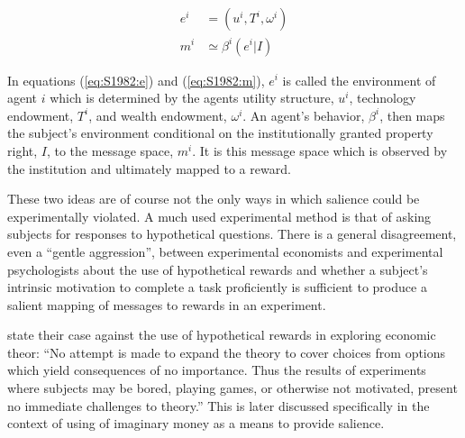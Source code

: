 \documentclass[11pt,a4paper]{report}
\begin{document}
\begin{align}
	e^i &= (u^i, T^i, \omega^i)\label{eq:S1982:e}\\
	m^i &\simeq \beta^i(e^i|I)\label{eq:S1982:m}
\end{align}

In equations (\ref{eq:S1982:e}) and (\ref{eq:S1982:m}), $e^i$ is called the environment of agent $i$ which is determined by the agents utility structure, $u^i$, technology endowment, $T^i$, and wealth endowment, $\omega^i$.
An agent's behavior, $\beta^i$, then maps the subject's environment conditional on the institutionally granted property right, $I$, to the message space, $m^i$.
It is this message space which is observed by the institution and ultimately mapped to a reward.

These two ideas are of course not the only ways in which salience could be experimentally violated.
A much used experimental method is that of asking subjects for responses to hypothetical questions.
There is a general disagreement, even a \enquote{gentle aggression}{\footnotemark}, between experimental economists and experimental psychologists about the use of hypothetical rewards and whether a subject's intrinsic motivation to complete a task proficiently is sufficient to produce a salient mapping of messages to  rewards in an experiment.
\addtocounter{footnote}{-1}

\textcite[624]{Grether1979} state their case against the use of hypothetical rewards in exploring economic theor:
\enquote{No attempt is made to expand the theory to cover choices from options which yield consequences of no importance.\textelp{} Thus the results of experiments where subjects may be bored, playing games, or otherwise not motivated, present no immediate challenges to theory.} 
This is later discussed specifically in the context of using of imaginary money as a means to provide salience.
\end{document}
